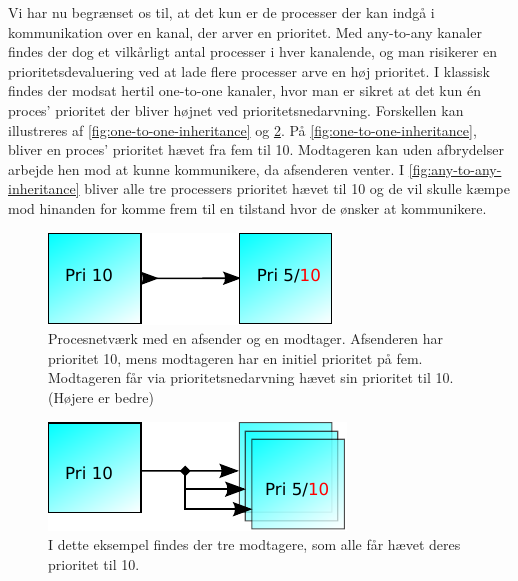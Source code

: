 Vi har nu begrænset os til, at det kun er de processer der kan indgå i kommunikation over en kanal, der arver en prioritet. Med any-to-any kanaler findes der dog et vilkårligt antal processer i hver kanalende, og man risikerer en prioritetsdevaluering ved at lade flere processer arve en høj prioritet. I klassisk \csp findes der modsat hertil one-to-one kanaler, hvor man er sikret at det kun én proces' prioritet der bliver højnet ved prioritetsnedarvning. Forskellen kan illustreres af \autoref{fig:one-to-one-inheritance} og \cref{fig:any-to-any-inheritance}. På \autoref{fig:one-to-one-inheritance}, bliver en proces' prioritet hævet fra fem til 10. Modtageren kan uden afbrydelser arbejde hen mod at kunne kommunikere, da afsenderen venter. I \autoref{fig:any-to-any-inheritance} bliver alle tre processers prioritet hævet til 10 og de vil skulle kæmpe mod hinanden for komme frem til en tilstand hvor de ønsker at kommunikere. 

\begin{figure}
 \begin{center}
  \includegraphics[scale=1.00]{images/one-to-one-inheritance}
\caption{Procesnetværk med en afsender og en modtager. Afsenderen har prioritet 10, mens modtageren har en initiel prioritet på fem. Modtageren  får via prioritetsnedarvning hævet sin prioritet til 10. (Højere er bedre)}
  \label{fig:one-to-one-inheritance}
  \end{center}
\end{figure}

\begin{figure}
 \begin{center}
  \includegraphics[scale=1.00]{images/any-to-any-inheritance}
  \caption{I dette eksempel findes der tre modtagere, som alle får hævet deres prioritet til 10.}
  \label{fig:any-to-any-inheritance}
  \end{center}
\end{figure}

